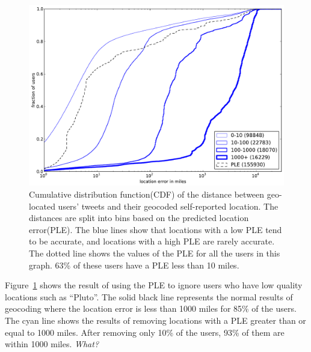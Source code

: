 \begin{figure}[tb]
\centering
\includegraphics[width=\linewidth]{figures/mloc_mdist.pdf}
\caption{
Cumulative distribution function(CDF) of the distance between geo-located
users' tweets and their geocoded self-reported location.
%
The distances are split into bins based on the predicted location error(PLE).
%
The blue lines show that locations with a low PLE tend to be accurate, and
locations with a high PLE are rarely accurate.
%
The dotted line shows the values of the PLE for all the
users in this graph.
%
63\% of these users have a PLE less than 10 miles.
}
\label{fig:DiffMlocMdist}
\end{figure}

Figure~\ref{fig:DiffMlocMdist} shows the result of using the PLE to ignore
users who have low quality locations such as ``Pluto''.
The solid black line represents the normal results of geocoding where the
location error is less than 1000 miles for 85\% of the users.
The cyan line shows the results of removing locations with a PLE greater than
or equal to 1000 miles.
After removing only 10\% of the users, 93\% of them are within 1000 miles.
\emph{What?}
